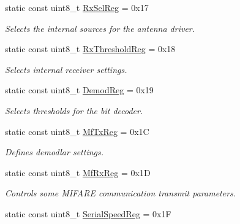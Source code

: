 \begin{DoxyCompactItemize}
static const uint8\+\_\+t \hyperlink{classMFRC522_ac2c0cc7b2d5068c85074acc23a648304}{Rx\+Sel\+Reg} = 0x17
\begin{DoxyCompactList}\small\item\em Selects the internal sources for the antenna driver. \end{DoxyCompactList}\item 
\mbox{\label{classMFRC522_a1b2198d0854741c169234c9d2739e504}} 
static const uint8\+\_\+t \hyperlink{classMFRC522_a1b2198d0854741c169234c9d2739e504}{Rx\+Threshold\+Reg} = 0x18
\begin{DoxyCompactList}\small\item\em Selects internal receiver settings. \end{DoxyCompactList}\item 
\mbox{\label{classMFRC522_a572ee6f622da471c04fb82775a3bc0e5}} 
static const uint8\+\_\+t \hyperlink{classMFRC522_a572ee6f622da471c04fb82775a3bc0e5}{Demod\+Reg} = 0x19
\begin{DoxyCompactList}\small\item\em Selects thresholds for the bit decoder. \end{DoxyCompactList}\item 
\mbox{\label{classMFRC522_aa976848be7b3270afec5207783cc2772}} 
static const uint8\+\_\+t \hyperlink{classMFRC522_aa976848be7b3270afec5207783cc2772}{Mf\+Tx\+Reg} = 0x1C
\begin{DoxyCompactList}\small\item\em Defines demodlar settings. \end{DoxyCompactList}\item 
\mbox{\label{classMFRC522_acb62dc819b455ee6a404bdfe191a7132}} 
static const uint8\+\_\+t \hyperlink{classMFRC522_acb62dc819b455ee6a404bdfe191a7132}{Mf\+Rx\+Reg} = 0x1D
\begin{DoxyCompactList}\small\item\em Controls some M\+I\+F\+A\+RE communication transmit parameters. \end{DoxyCompactList}\item 
\mbox{\label{classMFRC522_a277d829630c5c1fc131c71e286fc322a}} 
static const uint8\+\_\+t \hyperlink{classMFRC522_a277d829630c5c1fc131c71e286fc322a}{Serial\+Speed\+Reg} = 0x1F

\end{DoxyCompactItemize}
